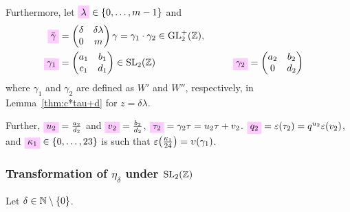 \documentclass{article}
\begin{document}
Furthermore, let
$\defineNotation[lambda]{\lambda}\in\Set{0,\ldots,m-1}$ and
\begin{alignat}{2}
  \defineNotation[gammabar]{\bar{\gamma}}
  &=
    \begin{pmatrix}\delta& \delta \lambda\\0&m\end{pmatrix}
    \gamma
    =
    \gamma_1 \cdot \gamma_2
    \in \mathrm{GL}_2^+(\setZ),
    \label{eq:gammabar}
  \\
  \defineNotation[gamma1]{\gamma_1}
  &=
    \begin{pmatrix}a_1& b_1\\c_1&d_1\end{pmatrix} \in \SL2Z
  &\qquad
  \defineNotation[gamma2]{\gamma_2}
  &=
    \begin{pmatrix}a_2& b_2\\0  &d_2\end{pmatrix}
    \label{eq:gamma1}
\end{alignat}
where $\gamma_1$ and $\gamma_2$ are defined as $W'$ and $W''$,
respectively, in Lemma~\ref{thm:c*tau+d} for $z = \delta\lambda$.

Further, $\defineNotation[u2]{u_2} = \frac{a_2}{d_2}$ and
$\defineNotation[v2]{v_2} = \frac{b_2}{d_2}$,
$\defineNotation[tau2]{\tau_2} = \gamma_2\tau = u_2\tau + v_2$.
$\defineNotation[q2]{q_2} = \unityPower{\tau_2} =
q^{u_2}\unityPower{v_2}$, and
$\defineNotation[kappa1]{\kappa_1} \in \Set{0,\ldots,23}$ is such that
$\varepsilon\!\left(\frac{\kappa_1}{24}\right) = \upsilon(\gamma_1)$.




























\subsubsection{Transformation of $\eta_\delta$ under $\SL2Z$}
\label{sec:eta_delta-transformation}
Let $\delta \in \mathbb{N}\setminus\left\{0\right\}$.
\end{document}
